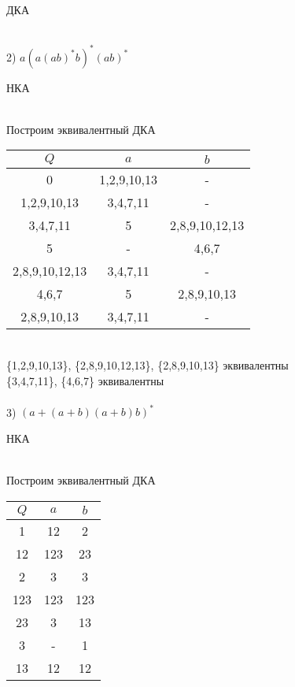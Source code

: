 \documentclass[a4paper,12pt]{article}
\begin{document}
ДКА

 \\


2) $ a(a (ab)^{*} b)^{*} (ab)^{*} $

НКА

 \\

Построим эквивалентный ДКА\\
\begin{center}
    \begin{tabular}{ |c|c|c| } 
        \hline
        $Q$ & $a$ & $b$ \\
        \hline\hline
        0 & 1,2,9,10,13 & - \\
        \hline
        1,2,9,10,13 & 3,4,7,11 & - \\
        \hline
        3,4,7,11 & 5 & 2,8,9,10,12,13 \\
        \hline
        5 & - & 4,6,7 \\
        \hline
        2,8,9,10,12,13 & 3,4,7,11 & - \\
        \hline
        4,6,7 & 5 & 2,8,9,10,13 \\
        \hline
        2,8,9,10,13 & 3,4,7,11 & -\\
        \hline
    \end{tabular}
\end{center}

 \\

\{1,2,9,10,13\}, \{2,8,9,10,12,13\}, \{2,8,9,10,13\} эквивалентны \\

\{3,4,7,11\}, \{4,6,7\} эквивалентны \\

 \\

3) $ (a + (a + b)(a + b)b)^{*} $

НКА

 \\

Построим эквивалентный ДКА\\

\begin{center}
    \begin{tabular}{ |c|c|c| } 
        \hline
        $Q$ & $a$ & $b$ \\
        \hline\hline
        1 & 12 & 2 \\
        \hline
        12 & 123 & 23 \\
        \hline
        2 & 3 & 3 \\
        \hline
        123 & 123 & 123 \\
        \hline
        23 & 3 & 13 \\
        \hline
        3 & - & 1 \\
        \hline
        13 & 12 & 12 \\
        \hline
    \end{tabular}
\end{center}
\end{document}
